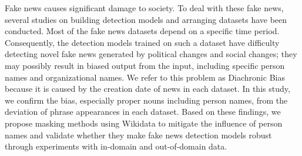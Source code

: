 Fake news causes significant damage to society. To deal with these fake news, several studies on building detection models and arranging datasets have been conducted. Most of the fake news datasets depend on a specific time period. Consequently, the detection models trained on such a dataset have difficulty detecting novel fake news generated by political changes and social changes; they may possibly result in biased output from the input, including specific person names and organizational names. We refer to this problem as Diachronic Bias because it is caused by the creation date of news in each dataset. In this study, we confirm the bias, especially proper nouns including person names, from the deviation of phrase appearances in each dataset. Based on these findings, we propose masking methods using Wikidata to mitigate the influence of person names and validate whether they make fake news detection models robust through experiments with in-domain and out-of-domain data.
